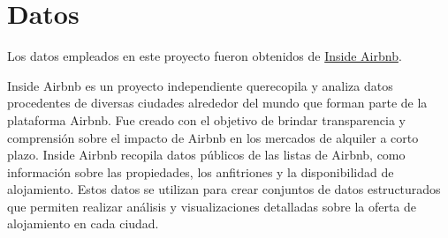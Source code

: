 \section{Datos}

Los datos empleados en este proyecto fueron obtenidos de \href{http://insideairbnb.com/}{Inside Airbnb}.

Inside Airbnb es un proyecto independiente querecopila y analiza datos procedentes de diversas ciudades alrededor del mundo que forman parte de la plataforma Airbnb. Fue creado con el objetivo de brindar transparencia y comprensión sobre el impacto de Airbnb en los mercados de alquiler a corto plazo. Inside Airbnb recopila datos públicos de las listas de Airbnb, como información sobre las propiedades, los anfitriones y la disponibilidad de alojamiento. Estos datos se utilizan para crear conjuntos de datos estructurados que permiten realizar análisis y visualizaciones detalladas sobre la oferta de alojamiento en cada ciudad.\\


